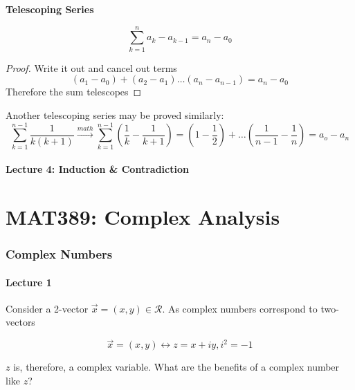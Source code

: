 \documentclass[10pt]{article}
\begin{document}
\textbf{Telescoping Series} 

\begin{equation}
	\sum_{k=1}^{n} a_k - a_{k-1} = a_n - a_0
\end{equation}

\begin{proof}
	Write it out and cancel out terms
	\begin{equation}
		(a_1 - a_0) + (a_2 - a_1) \ldots (a_n - a_{n-1}) = a_n - a_0
	\end{equation}
	Therefore the sum telescopes
\end{proof}


Another telescoping series may be proved similarly:
\begin{equation}
	\sum^{n-1}_{k=1} \frac{1}{k(k+1)} \xrightarrow{math} \sum^{n-1}_{k=1} (\frac{1}{k} - \frac{1}{k+1}) 
	= 
	(1- \frac{1}{2}) + \ldots (\frac{1}{n-1} - \frac{1}{n}) = a_o - a_n
\end{equation}


\subsection{Lecture 4: Induction \& Contradiction}




\part{MAT389: Complex Analysis}

\section{Complex Numbers}
\subsection{Lecture 1}

Consider a 2-vector $ \vec{x} = (x, y) \in \mathcal{R} $. 
As complex numbers correspond to two-vectors 

\begin{equation}
	\vec{x} = (x, y) \leftrightarrow z = x + iy, i^2 = -1
\end{equation}

$ z $ is, therefore, a complex variable. What are the benefits of a complex number like $ z $?
\end{document}

